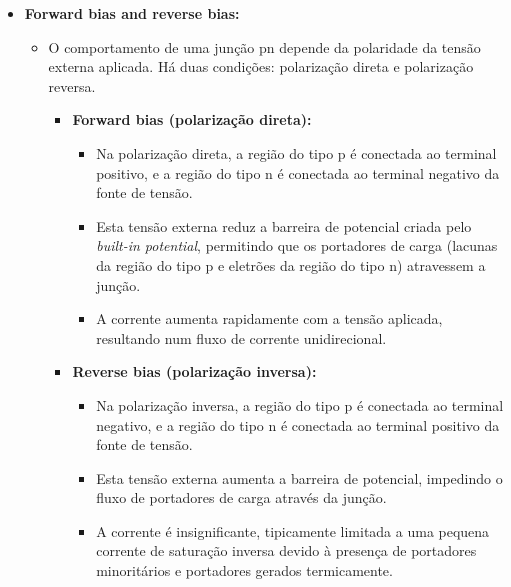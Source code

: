 \begin{itemize}[leftmargin=*, nolistsep]
    \item \textbf{Forward bias and reverse bias:}
    \begin{itemize}[label=$\blacktriangle$, leftmargin=*]
        \item O comportamento de uma junção pn depende da polaridade da tensão externa aplicada. Há duas condições: polarização direta e polarização reversa.
        \begin{itemize}[label=\rule{1ex}{1ex}, leftmargin=*]
            \item \textbf{Forward bias (polarização direta):}
            \begin{itemize}[label=$\pmb{-}$]
                \item Na polarização direta, a região do tipo p é conectada ao terminal positivo, e a região do tipo n é conectada ao terminal negativo da fonte de tensão.
                \item Esta tensão externa reduz a barreira de potencial criada pelo \textit{built-in potential}, permitindo que os portadores de carga (lacunas da região do tipo p e eletrões da região do tipo n) atravessem a junção.
                \item A corrente aumenta rapidamente com a tensão aplicada, resultando num fluxo de corrente unidirecional.
            \end{itemize}
        \end{itemize}
        
        \begin{itemize}[label=\rule{1ex}{1ex}, leftmargin=*]
            \item \textbf{Reverse bias (polarização inversa):}
            \begin{itemize}[label=$\pmb{-}$]
                \item Na polarização inversa, a região do tipo p é conectada ao terminal negativo, e a região do tipo n é conectada ao terminal positivo da fonte de tensão.
                \item Esta tensão externa aumenta a barreira de potencial, impedindo o fluxo de portadores de carga através da junção.
                \item A corrente é insignificante, tipicamente limitada a uma pequena corrente de saturação inversa devido à presença de portadores minoritários e portadores gerados termicamente.
            \end{itemize}
        \end{itemize}
    \end{itemize}
\end{itemize}

